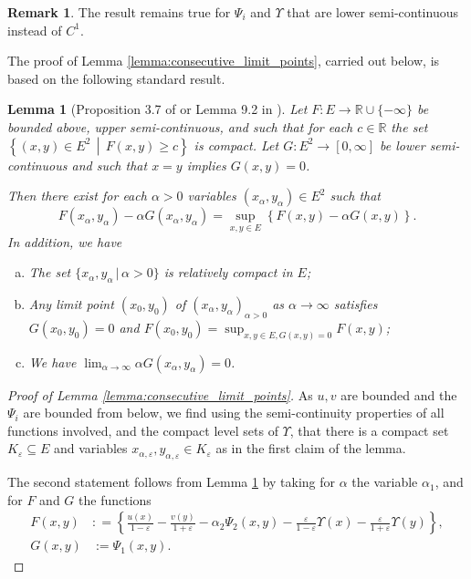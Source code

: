 \documentclass[a4paper]{article}
\newcommand{\bR}{\mathbb{R}}
\numberwithin{equation}{section}
\newtheorem{lemma}[theorem]{Lemma}
\theoremstyle{definition}
\newtheorem{remark}[theorem]{Remark}
\begin{document}
\begin{remark}
	The result remains true for $\Psi_i$ and $\Upsilon$ that are lower semi-continuous instead of $C^1$.
\end{remark}


The proof of Lemma \ref{lemma:consecutive_limit_points}, carried out below, is based on the following standard result. 



\begin{lemma}[Proposition 3.7 of \cite{CIL92} or Lemma 9.2 in \cite{FK06}] \label{lemma:abstract_doubling_lemma}
	Let $F : E \rightarrow \bR \cup \{-\infty\}$ be bounded above, upper semi-continuous, and such that for each $c \in \bR$ the set $\left\{(x,y) \in E^2 \, \middle| \, F(x,y) \geq c \right\}$ is compact. Let $G : E^2 \rightarrow [0,\infty]$ be lower semi-continuous and such that $x = y$ implies $G(x,y) = 0$.
	
	Then there exist for each $\alpha > 0$ variables $(x_\alpha,y_\alpha) \in E^2$ such that
	\begin{equation*}
		F(x_\alpha,y_\alpha) - \alpha G(x_\alpha,y_\alpha) = \sup_{x,y \in E} \left\{F(x,y) - \alpha G(x,y)  \right\}.
	\end{equation*}
	In addition, we have
	\begin{enumerate}[(a)]
		\item The set $\{x_{\alpha}, y_{\alpha} \, | \,  \alpha  > 0\}$ is relatively compact in $E$;
		\item Any limit point $(x_0,y_0)$ of  $(x_\alpha,y_\alpha)_{\alpha > 0}$ as $\alpha \rightarrow \infty$ satisfies $G(x_0,y_0) = 0$ and $F(x_0,y_0) = \sup_{x,y \in E, G(x,y) = 0} F(x,y)$;
		\item We have $\lim_{\alpha \rightarrow \infty} \alpha G(x_\alpha,y_\alpha) = 0$.
	\end{enumerate}
\end{lemma}

\begin{proof}[Proof of Lemma \ref{lemma:consecutive_limit_points}]
	As $u,v$ are bounded and the $\Psi_i$ are bounded from below, we find using the semi-continuity properties of all functions involved, and the compact level sets of $\Upsilon$, that there is a compact set $K_\varepsilon \subseteq E$ and variables $x_{\alpha,\varepsilon},y_{\alpha,\varepsilon} \in K_\varepsilon$ as in the first claim of the lemma. 
	
	The second statement follows from Lemma \ref{lemma:abstract_doubling_lemma} by taking for $\alpha$ the variable $\alpha_1$, and for $F$ and $G$ the functions
	\begin{align*}
		F(x,y) &: = \left\{\frac{u(x)}{1-\varepsilon} - \frac{v(y)}{1+\varepsilon} -  \alpha_2\Psi_2(x,y)  - \frac{\varepsilon}{1-\varepsilon}\Upsilon(x) - \frac{\varepsilon}{1+\varepsilon}\Upsilon(y)\right\}, \\
		G(x,y) & := \Psi_1(x,y).
	\end{align*}
\end{proof}
\end{document}
